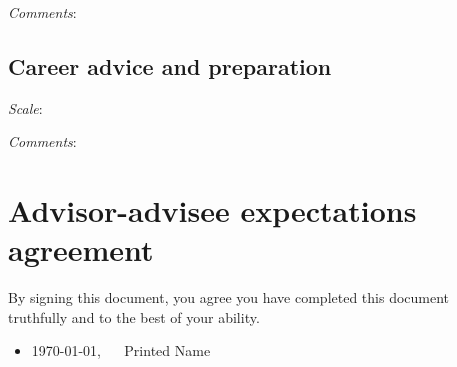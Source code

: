 \documentclass[10pt]{article}
\begin{document}
\textit{Comments}: %

\subsection*{Career advice and preparation}
\textit{Scale}: %

\textit{Comments}: %

\section*{Advisor-advisee expectations agreement}
By signing this document, you agree you have completed this document
truthfully and to the best of your ability.

\begin{itemize}[]
 \setlength\itemsep{3mm}
 \item \today, ~~ Printed Name
\end{itemize}
\end{document}
